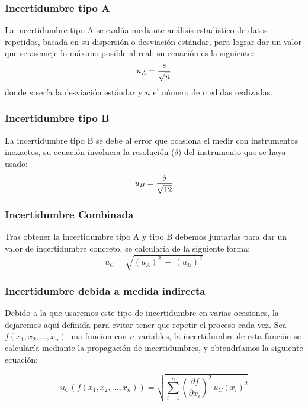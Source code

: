\documentclass[10pt,onecolumn]{article}
\begin{document}
\subsubsection{Incertidumbre tipo A}
La incertidumbre tipo A se evalúa mediante análisis estadístico de datos repetidos, basada en su dispersión o desviación estándar, para lograr dar un valor que se asemeje lo máximo posible al real; su ecuación es la siguiente:
\begin{equation}\centering
u_A = \dfrac{s}{\sqrt{n}}
\end{equation}
donde $s$ sería la desviación estándar y $n$ el número de medidas realizadas.

\subsubsection{Incertidumbre tipo B}
La incertidumbre tipo B se debe al error que ocasiona el medir con instrumentos inexactos, su ecuación involucra la resolución ($\delta$) del instrumento que se haya usado:
\begin{equation}\centering
    u_B = \dfrac{\delta}{\sqrt{12}}
\end{equation}

\subsubsection{Incertidumbre Combinada}
Tras obtener la incertidumbre tipo A y tipo B debemos juntarlas para dar un valor de incertidumbre concreto, se calcularía de la siguiente forma:
\begin{equation}
    u_C = \sqrt{(u_A)^2\ +\ (u_B)^2}
\end{equation}

\subsubsection{Incertidumbre debida a medida indirecta}
Debido a la que usaremos este tipo de incertidumbre en varias ocasiones, la dejaremos aquí definida para evitar 
tener que repetir el proceso cada vez. Sea $f(x_1,x_2,\ldots,x_n)$ una funcion con $n$ variables, la incertidumbre
de esta función se calcularía mediante la propagación de incertidumbres, y obtendríamos la siguiente ecuación:

\begin{equation}
    \boxed{u_C(f(x_1,x_2,\ldots,x_n)) = \sqrt{\sum_{i=1}^{n} \left(\dfrac{\partial f}{\partial x_i}\right)^2\ u_C(x_i)^2}}
\end{equation}
\end{document}
